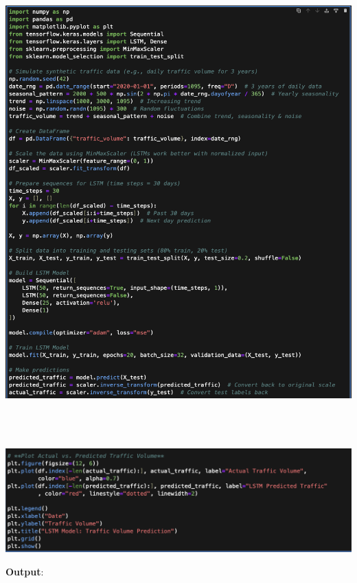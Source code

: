 \documentclass{article}
\begin{document}
\begin{itemize}
\begin{itemize}
\includegraphics[width=14cm,height=18cm]{LSTM.png}

\includegraphics[width=14cm,height=4cm]{LSTM2.png}

\textbf{Output}:


\end{itemize}
\end{itemize}
\end{document}
